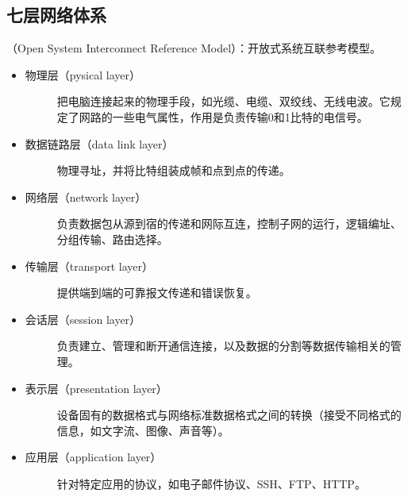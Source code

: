 \documentclass[letterpaper,10pt,english]{sphinxmanual}
\begin{document}
\subsection{七层网络体系}
\label{\detokenize{computerNetwork/01_architechture:id3}}
 （Open System Interconnect Reference Model）：开放式系统互联参考模型。
\begin{itemize}
\item {} \begin{description}
\item[{物理层（pysical layer）}] \leavevmode
把电脑连接起来的物理手段，如光缆、电缆、双绞线、无线电波。它规定了网路的一些电气属性，作用是负责传输0和1比特的电信号。

\end{description}

\item {} \begin{description}
\item[{数据链路层（data link layer）}] \leavevmode
物理寻址，并将比特组装成帧和点到点的传递。

\end{description}

\item {} \begin{description}
\item[{网络层（network layer）}] \leavevmode
负责数据包从源到宿的传递和网际互连，控制子网的运行，逻辑编址、分组传输、路由选择。

\end{description}

\item {} \begin{description}
\item[{传输层（transport layer）}] \leavevmode
提供端到端的可靠报文传递和错误恢复。

\end{description}

\item {} \begin{description}
\item[{会话层（session layer）}] \leavevmode
负责建立、管理和断开通信连接，以及数据的分割等数据传输相关的管理。

\end{description}

\item {} \begin{description}
\item[{表示层（presentation layer）}] \leavevmode
设备固有的数据格式与网络标准数据格式之间的转换（接受不同格式的信息，如文字流、图像、声音等）。

\end{description}

\item {} \begin{description}
\item[{应用层（application layer）}] \leavevmode
针对特定应用的协议，如电子邮件协议、SSH、FTP、HTTP。

\end{description}

\end{itemize}
\end{document}
